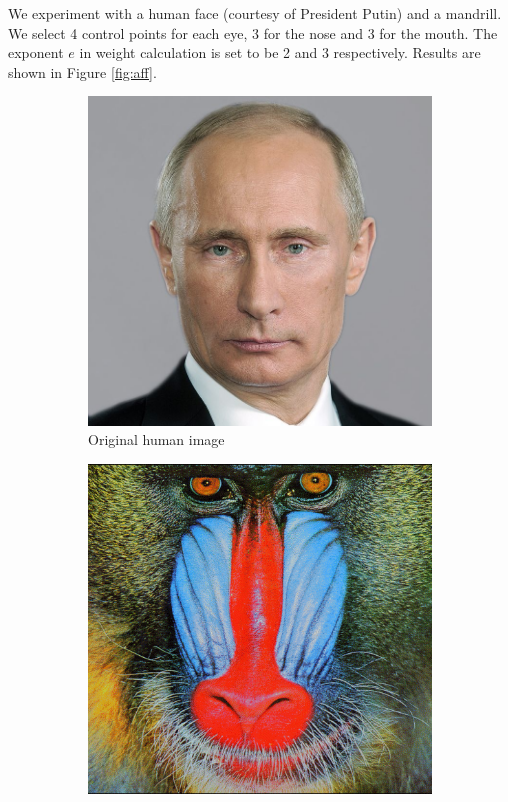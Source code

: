 \documentclass[UTF8]{ctexart}
\begin{document}
We experiment with a human face (courtesy of President Putin) and a mandrill. We select 4 control points for each eye,
3 for the nose and 3 for the mouth. The exponent $e$ in weight calculation is set to be 2 and 3 respectively.
Results are shown in Figure \ref{fig:aff}.\\
\newpage
\begin{figure}[htbp]
    \centering
    \begin{subfigure}{0.3\textwidth}
        \centering
        \includegraphics[width=\linewidth]{Putin.jpg}
        \caption{Original human image}
    \end{subfigure}%
    \hfill
    \begin{subfigure}{0.3\textwidth}
        \centering
        \includegraphics[width=\linewidth]{mandrill.png}

\end{subfigure}
\end{figure}
\end{document}

